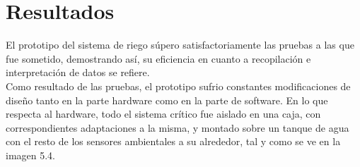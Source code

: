 \begin{comment} 
Se puede observar en la imagen \ref{evento1} que, cuando el sensor de humedad del suelo reporta valores altos, el riego se detiene en el momento. 

\begin{figure}[H]
	\begin{center}
		\subfigure[Detecci\'on de un nivel alto de humedad del suelo.]{\texttt{[image: r4]}}
		\subfigure[Riego detenido.]{\texttt{[image: r4]}}
	\end{center}
	\label{evento1}
	\caption{Primera evento considerado.}
\end{figure} 

En caso de que se detecten valores bajos de humedad en el suelo como en la imagen \ref{evento2}, el riego dar\'a inicio de manera autom\'atica. 

\begin{figure}[H]
	\begin{center}
		\subfigure[Detecci\'on de un nivel bajo de humedad del suelo.]{\texttt{[image: r4]}}
		\subfigure[Riego detenido.]{\texttt{[image: r4]}}
	\end{center}
	\label{evento2}
	\caption{Segundo evento considerado.}
\end{figure} 

Otra forma de detener el flujo de agua, es detectando un nivel de agua bajo parecido al de la imagen \ref{event3}.  

\begin{figure}[H]
	\begin{center}
		\subfigure[Detecci\'on de un bajo nivel de agua.]{\texttt{[image: r4]}}
		\subfigure[Riego detenido.]{\texttt{[image: r4]}}
	\end{center}
	\label{event3}
	\caption{Tercer evento considerado.}
\end{figure} 

\end{comment}

\section{Resultados}
El prototipo del sistema de riego s\'upero satisfactoriamente las pruebas a las que fue sometido, demostrando as\'i, su eficiencia en cuanto a recopilaci\'on e interpretaci\'on de datos se refiere.\\ 
Como resultado de las pruebas, el prototipo sufrio constantes modificaciones de dise\~{n}o tanto en la parte hardware como en la parte de software. En lo que respecta al hardware, todo el sistema crítico fue aislado en una caja, con correspondientes adaptaciones a la misma, y montado sobre un tanque de agua con el resto de los sensores ambientales a su alrededor, tal y como se ve en la imagen 5.4.%

